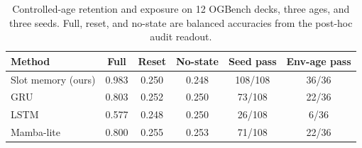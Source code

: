 \begin{table}[H]
\centering
\footnotesize
\caption{Controlled-age retention and exposure on 12 OGBench decks, three ages, and three seeds. Full, reset, and no-state are balanced accuracies from the post-hoc audit readout.}
\label{tab:main-comparison}
\begin{tabular}{lccccc}
\toprule
Method & Full & Reset & No-state & Seed pass & Env-age pass\\
\midrule
Slot memory (ours) & 0.983 & 0.250 & 0.248 & 108/108 & 36/36\\
GRU & 0.803 & 0.252 & 0.250 & 73/108 & 22/36\\
LSTM & 0.577 & 0.248 & 0.250 & 26/108 & 6/36\\
Mamba-lite & 0.800 & 0.255 & 0.253 & 71/108 & 22/36\\
\bottomrule
\end{tabular}
\end{table}
